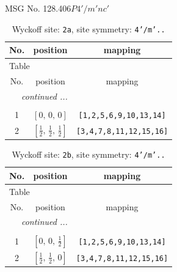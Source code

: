 \documentclass[fleqn,8pt]{jsarticle}
\begin{document}
\setcounter{MaxMatrixCols}{32}

\renewcommand{\tablename}{Table~}
\renewcommand{\figurename}{Figure~}
\begin{center}
\LARGE
MSG No. 128.406\quad$P4'/m'nc'$
\end{center}
\renewcommand{\arraystretch}{1.2}
\begin{longtable}{ccc}
\caption{Wyckoff site: {\tt 2a}, site symmetry: {\tt 4'/m'..}}
 \\
 \hline \hline
No. & position & mapping \\ \hline \endfirsthead

\multicolumn{2}{l}{\tablename\ \thetable{}} \\
 \hline \hline
No. & position & mapping \\ \hline \endhead

 \hline \hline
\multicolumn{2}{r}{\footnotesize\it continued ...} \\ \endfoot

 \hline \hline
\multicolumn{2}{r}{} \\ \endlastfoot

1 & $\left[ 0,\, 0,\, 0 \right]$ & {\tt [1,2,5,6,9,10,13,14]} \\ \hline
2 & $\left[ \frac{1}{2},\, \frac{1}{2},\, \frac{1}{2} \right]$ & {\tt [3,4,7,8,11,12,15,16]} \\
\end{longtable}
\renewcommand{\arraystretch}{1.2}
\begin{longtable}{ccc}
\caption{Wyckoff site: {\tt 2b}, site symmetry: {\tt 4'/m'..}}
 \\
 \hline \hline
No. & position & mapping \\ \hline \endfirsthead

\multicolumn{2}{l}{\tablename\ \thetable{}} \\
 \hline \hline
No. & position & mapping \\ \hline \endhead

 \hline \hline
\multicolumn{2}{r}{\footnotesize\it continued ...} \\ \endfoot

 \hline \hline
\multicolumn{2}{r}{} \\ \endlastfoot

1 & $\left[ 0,\, 0,\, \frac{1}{2} \right]$ & {\tt [1,2,5,6,9,10,13,14]} \\ \hline
2 & $\left[ \frac{1}{2},\, \frac{1}{2},\, 0 \right]$ & {\tt [3,4,7,8,11,12,15,16]} \\
\end{longtable}
\end{document}
